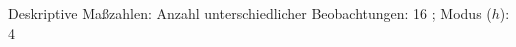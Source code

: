				\label{tableValues:bstu17}
				\vspace*{-\baselineskip}
                    \begin{noten}
                	    \note{} Deskriptive Maßzahlen:
                	    Anzahl unterschiedlicher Beobachtungen: 16%
                	    ; 
                	      Modus ($h$): 4
                     \end{noten}


